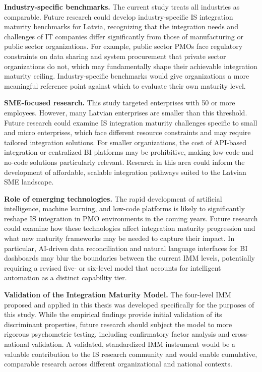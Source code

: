 \textbf{Industry-specific benchmarks.} The current study treats all
industries as comparable. Future research could develop
industry-specific IS integration maturity benchmarks for Latvia,
recognizing that the integration needs and challenges of IT companies
differ significantly from those of manufacturing or public sector
organizations. For example, public sector PMOs face regulatory
constraints on data sharing and system procurement that private
sector organizations do not, which may fundamentally shape their
achievable integration maturity ceiling. Industry-specific benchmarks
would give organizations a more meaningful reference point against
which to evaluate their own maturity level.

\textbf{SME-focused research.} This study targeted enterprises with
50 or more employees. However, many Latvian enterprises are smaller
than this threshold. Future research could examine IS integration
maturity challenges specific to small and micro enterprises, which
face different resource constraints and may require tailored
integration solutions. For smaller organizations, the cost of
API-based integration or centralized BI platforms may be prohibitive,
making low-code and no-code solutions particularly relevant. Research
in this area could inform the development of affordable, scalable
integration pathways suited to the Latvian SME landscape.

\textbf{Role of emerging technologies.} The rapid development of
artificial intelligence, machine learning, and low-code platforms
is likely to significantly reshape IS integration in PMO environments
in the coming years. Future research could examine how these
technologies affect integration maturity progression and what new
maturity frameworks may be needed to capture their impact. In
particular, AI-driven data reconciliation and natural language
interfaces for BI dashboards may blur the boundaries between the
current IMM levels, potentially requiring a revised five- or
six-level model that accounts for intelligent automation as a
distinct capability tier.

\textbf{Validation of the Integration Maturity Model.} The four-level
IMM proposed and applied in this thesis was developed specifically
for the purposes of this study. While the empirical findings provide
initial validation of its discriminant properties, future research
should subject the model to more rigorous psychometric testing,
including confirmatory factor analysis and cross-national validation.
A validated, standardized IMM instrument would be a valuable
contribution to the IS research community and would enable
cumulative, comparable research across different organizational
and national contexts.

